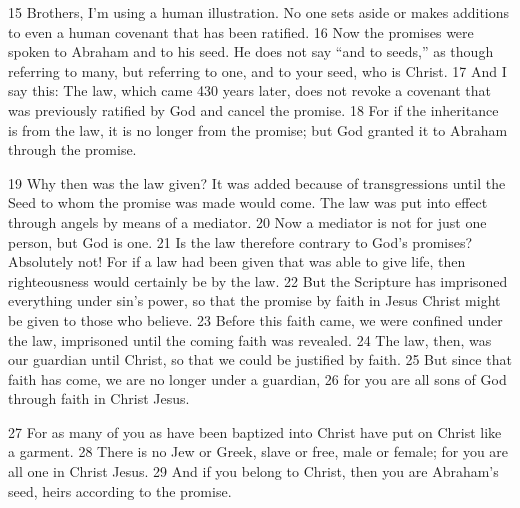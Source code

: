 \begin{bible}
15 Brothers, I'm using a human illustration. No one sets aside or makes additions to even a human covenant that has been ratified.  16 Now the promises were spoken to Abraham and to his seed. He does not say ``and to seeds,'' as though referring to many, but referring to one, and to your seed, who is Christ.  17 And I say this: The law, which came 430 years later, does not revoke a covenant that was previously ratified by God and cancel the promise.  18 For if the inheritance is from the law, it is no longer from the promise; but God granted it to Abraham through the promise.

19 Why then was the law given? It was added because of transgressions until the Seed to whom the promise was made would come. The law was put into effect through angels by means of a mediator.  20 Now a mediator is not for just one person, but God is one.  21 Is the law therefore contrary to God's promises? Absolutely not! For if a law had been given that was able to give life, then righteousness would certainly be by the law.  22 But the Scripture has imprisoned everything under sin's power, so that the promise by faith in Jesus Christ might be given to those who believe.  23 Before this faith came, we were confined under the law, imprisoned until the coming faith was revealed.  24 The law, then, was our guardian until Christ, so that we could be justified by faith.  25 But since that faith has come, we are no longer under a guardian,  26 for you are all sons of God through faith in Christ Jesus.

27 For as many of you as have been baptized into Christ have put on Christ like a garment.  28 There is no Jew or Greek, slave or free, male or female; for you are all one in Christ Jesus.  29 And if you belong to Christ, then you are Abraham's seed, heirs according to the promise. 

\end{bible}

